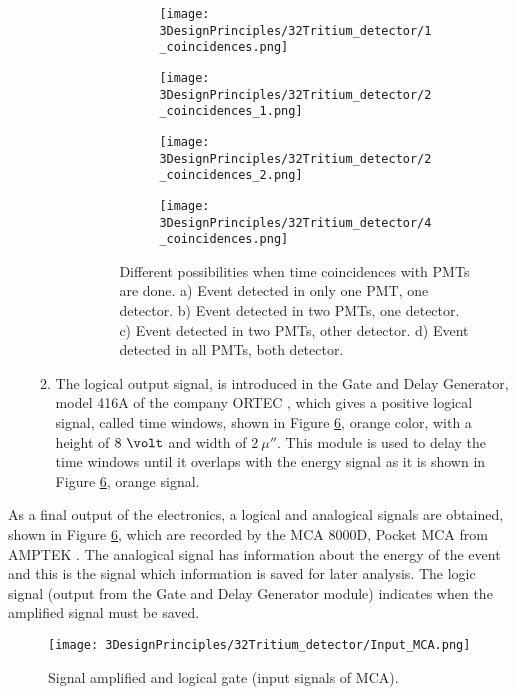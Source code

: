\begin{enumerate}
\begin{enumerate}
\begin{enumerate}
\begin{figure}
\centering
    \begin{subfigure}[b]{0.45\textwidth}
    \centering
    \texttt{[image: 3DesignPrinciples/32Tritium\_detector/1\_coincidences.png]}  
    \caption{\label{subfig:signalInOnePMT}}
    \end{subfigure}
    \hfill
    \begin{subfigure}[b]{0.45\textwidth}
    \centering
    \texttt{[image: 3DesignPrinciples/32Tritium\_detector/2\_coincidences\_1.png]}  
    \caption{\label{subfig:signalInTwoPMTOneDetector}}
    \end{subfigure}
    \hfill
    \begin{subfigure}[b]{0.45\textwidth}
    \centering
    \texttt{[image: 3DesignPrinciples/32Tritium\_detector/2\_coincidences\_2.png]}  
    \caption{\label{subfig:signalInTwoPMTOtherDetector}}
    \end{subfigure}
    \hfill
    \begin{subfigure}[b]{0.45\textwidth}
    \centering
    \texttt{[image: 3DesignPrinciples/32Tritium\_detector/4\_coincidences.png]}  
    \caption{\label{subfig:signalInAllPMTsBothDetector}}
    \end{subfigure}
 \caption{Different possibilities when time coincidences with PMTs are done. a) Event detected in only one PMT, one detector. b) Event detected in two PMTs, one detector. c) Event detected in two PMTs, other detector. d) Event detected in all PMTs, both detector.}
 \label{fig:DifferentCoincidences}
\end{figure}

\end{enumerate}

\item{} The logical output signal, is introduced in the Gate and Delay Generator, model 416A of the company ORTEC \cite{DataSheetGateAndDelay}, which gives a positive logical signal, called time windows, shown in Figure \ref{fig:InputSignalsMCA}, orange color, with a height of $8~\volt$ and width of $2~\mu\second$. This module is used to delay the time windows until it overlaps with the energy signal as it is shown in Figure \ref{fig:InputSignalsMCA}, orange signal.

\end{enumerate}

\end{enumerate}

As a final output of the electronics, a logical and analogical signals are obtained, shown in Figure \ref{fig:InputSignalsMCA}, which are recorded by the MCA 8000D, Pocket MCA from AMPTEK \cite{DataSheetMCA}. The analogical signal has information about the energy of the event and this is the signal which information is saved for later analysis. The logic signal (output from the Gate and Delay Generator module) indicates when the amplified signal must be saved.

\begin{figure}[htbp]
\centering
\texttt{[image: 3DesignPrinciples/32Tritium\_detector/Input\_MCA.png]}
\caption{Signal amplified and logical gate (input signals of MCA).\label{fig:InputSignalsMCA}}
\end{figure}